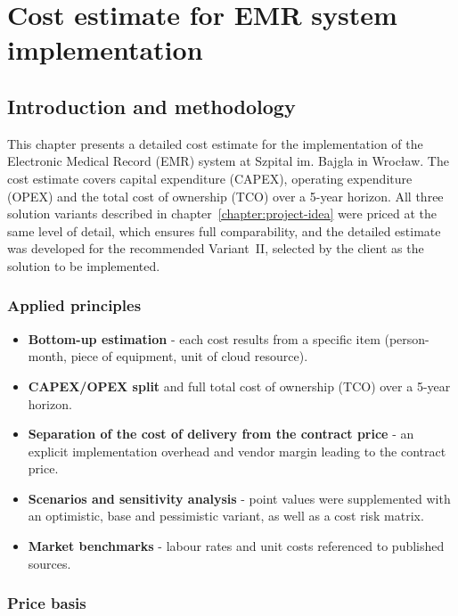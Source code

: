 \chapter{Cost estimate for EMR system implementation}
\label{chapter:costs}

\section{Introduction and methodology}

This chapter presents a detailed cost estimate for the implementation of the Electronic Medical Record (EMR) system at Szpital im. Bajgla in Wrocław. The cost estimate covers capital expenditure (CAPEX), operating expenditure (OPEX) and the total cost of ownership (TCO) over a 5-year horizon. All three solution variants described in chapter~\ref{chapter:project-idea} were priced at the same level of detail, which ensures full comparability, and the detailed estimate was developed for the recommended Variant~II, selected by the client as the solution to be implemented.

\subsection{Applied principles}

\begin{itemize}
    \item \textbf{Bottom-up estimation} - each cost results from a specific item (person-month, piece of equipment, unit of cloud resource).
    \item \textbf{CAPEX/OPEX split} and full total cost of ownership (TCO) over a 5-year horizon.
    \item \textbf{Separation of the cost of delivery from the contract price} - an explicit implementation overhead and vendor margin leading to the contract price.
    \item \textbf{Scenarios and sensitivity analysis} - point values were supplemented with an optimistic, base and pessimistic variant, as well as a cost risk matrix.
    \item \textbf{Market benchmarks} - labour rates and unit costs referenced to published sources.
\end{itemize}

\subsection{Price basis}

